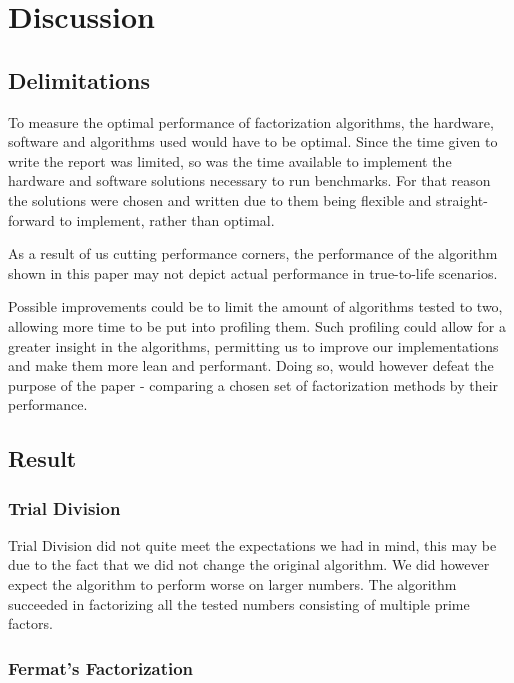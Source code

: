 \chapter{Discussion}

\section{Delimitations}
To measure the optimal performance of factorization algorithms, the hardware, software and algorithms used would have to be optimal. Since the time given to write the report was limited, so was the time available to implement the hardware and software solutions necessary to run benchmarks. For that reason the solutions were chosen and written due to them being flexible and straight-forward to implement, rather than optimal.

As a result of us cutting performance corners, the performance of the algorithm shown in this paper may not depict actual performance in true-to-life scenarios.

Possible improvements could be to limit the amount of algorithms tested to two, allowing more time to be put into profiling them. Such profiling could allow for a greater insight in the algorithms, permitting us to improve our implementations and make them more lean and performant. Doing so, would however defeat the purpose of the paper - comparing a chosen set of factorization methods by their performance.

\section{Result}

\subsection{Trial Division}

Trial Division did not quite meet the expectations we had in mind, this may be due to the fact that we did not change the original algorithm. We did however expect the algorithm to perform worse on larger numbers. The algorithm succeeded in factorizing all the tested numbers consisting of multiple prime factors.

\subsection{Fermat's Factorization}

